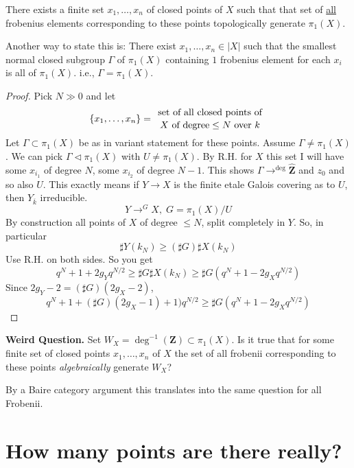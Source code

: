 \begin{proposition}
\label{proposition-finite-set-frobenii-generate-topologically}
There exists a finite set $x_1, \ldots, x_n$ of closed points of $X$
such that that set of \underline{all} frobenius elements corresponding to these
points topologically generate $\pi_1(X)$.
\end{proposition}

\noindent
Another way to state this is:
There exist $x_1, \ldots, x_n\in |X|$ such that
the smallest normal closed subgroup $\Gamma$ of $\pi_1(X)$
containing $1$ frobenius element for each $x_i$ is all of $\pi_1(X)$. i.e.,
$\Gamma = \pi_1(X)$.

\begin{proof}
Pick $N\gg 0$ and let
$$
\left\{x_1, \ldots, x_n\right\}={\text{ set of all closed points of
}\atop X\text{ of degree} \leq N\text{ over } k}
$$
Let $\Gamma\subset \pi_1(X)$ be as in variant statement for these
points. Assume $\Gamma\neq \pi_1(X)$. We can pick $\Gamma\lhd \pi_1(X)$ with
$U\neq \pi_1(X)$. By R.H. for $X$ this set I will have some $x_{i_1}$ of degree
$N$, some $x_{i_2}$ of degree $N-1$. This shows
$\Gamma\to^{\deg}\widehat{\mathbf{Z}}$ and $z_0$ and so also $U$. This exactly
means if $Y\to X$ is the finite etale Galois covering as to $U$, then
$Y_{\overline k}$ irreducible.
$$
Y\to^G X, \; G = \pi_1(X)/U
$$
By construction all points of $X$ of degree $\leq N$, split
completely in $Y$. So, in particular
$$
\sharp Y(k_N)\geq (\sharp G)\sharp X(k_N)
$$
Use R.H. on both sides. So you get
$$
q^N+1+2g_Yq^{N/2}\geq \sharp G\sharp X(k_N)\geq \sharp
G(q^N+1-2g_Xq^{N/2})
$$
Since $2g_Y-2 = (\sharp G)(2g_X-2)$,
$$
q^N+1+(\sharp G)(2g_X-1)+1)q^{N/2}\geq \sharp
G(q^N+1-2g_Xq^{N/2})
$$
\end{proof}	

\noindent
{\bf Weird Question.}
Set $W_X = \deg^{-1}(\mathbf{Z})\subset \pi_1(X)$.
Is it true that for some finite set of closed points $x_1, \ldots, x_n$ of $X$
the set of all frobenii corresponding to these points
{\it algebraically} generate $W_X$?

\medskip\noindent
By a Baire category argument this translates into the same question
for all Frobenii.





\section{How many points are there really?}
\label{section-really}

